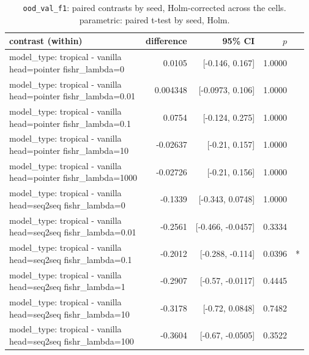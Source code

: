 \documentclass[10pt]{article}
\makeatletter
\newcommand{\stackcell}[1]{\begin{tabular}[t]{@{}l@{}}#1\end{tabular}}
\makeatother
\begin{document}
{\small
\begin{longtable}{lrrrl}
\caption{\texttt{ood\_val\_f1}: paired contrasts by seed, Holm-corrected across the cells. parametric: paired t-test by seed, Holm.}\label{tab:paired-ood_val_f1}\\
\toprule
contrast (within) & difference & 95\% CI & $p$ & \\
\midrule
\endhead
\stackcell{model\_type: tropical - vanilla\\\footnotesize head=pointer fishr\_lambda=0 } & 0.0105 & [-0.146, 0.167] & 1.0000 & \\
\stackcell{model\_type: tropical - vanilla\\\footnotesize head=pointer fishr\_lambda=0.01 } & 0.004348 & [-0.0973, 0.106] & 1.0000 & \\
\stackcell{model\_type: tropical - vanilla\\\footnotesize head=pointer fishr\_lambda=0.1 } & 0.0754 & [-0.124, 0.275] & 1.0000 & \\
\stackcell{model\_type: tropical - vanilla\\\footnotesize head=pointer fishr\_lambda=10 } & -0.02637 & [-0.21, 0.157] & 1.0000 & \\
\stackcell{model\_type: tropical - vanilla\\\footnotesize head=pointer fishr\_lambda=1000 } & -0.02726 & [-0.21, 0.156] & 1.0000 & \\
\stackcell{model\_type: tropical - vanilla\\\footnotesize head=seq2seq fishr\_lambda=0 } & -0.1339 & [-0.343, 0.0748] & 1.0000 & \\
\stackcell{model\_type: tropical - vanilla\\\footnotesize head=seq2seq fishr\_lambda=0.01 } & -0.2561 & [-0.466, -0.0457] & 0.3334 & \\
\stackcell{model\_type: tropical - vanilla\\\footnotesize head=seq2seq fishr\_lambda=0.1 } & -0.2012 & [-0.288, -0.114] & 0.0396 & *\\
\stackcell{model\_type: tropical - vanilla\\\footnotesize head=seq2seq fishr\_lambda=1 } & -0.2907 & [-0.57, -0.0117] & 0.4445 & \\
\stackcell{model\_type: tropical - vanilla\\\footnotesize head=seq2seq fishr\_lambda=10 } & -0.3178 & [-0.72, 0.0848] & 0.7482 & \\
\stackcell{model\_type: tropical - vanilla\\\footnotesize head=seq2seq fishr\_lambda=100 } & -0.3604 & [-0.67, -0.0505] & 0.3522 & \\

\end{longtable}}
\end{document}
